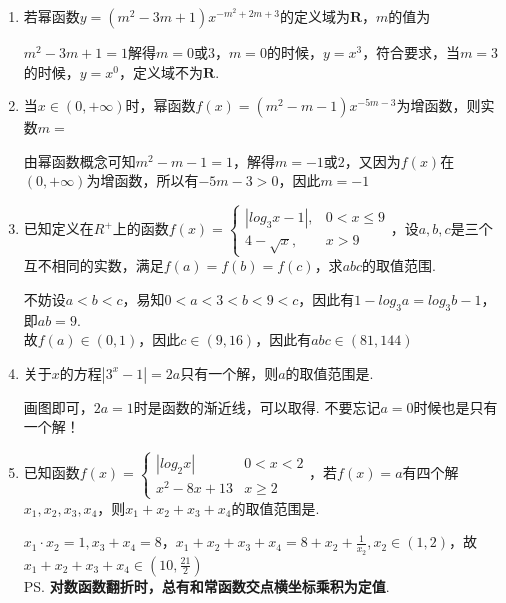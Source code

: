 \begin{enumerate}
    \begin{jieda}
        考虑换底，$log_{xy}z = \frac{log_xz}{log_xy+1}, log_{yz}x = \frac{1}{log_xy+log_xz}, log_{zx}y = \frac{log_xy}{log_xz + 1}$\\
        故设$a = log_xy, b = log_xz$\\
        原式等于$\frac{1 - 2 \cdot \frac{b}{a+1} \cdot \frac{a}{b+1} \cdot \frac{1}{a+b}}{\frac{b}{a+1}\cdot \frac{a}{b+1} + \frac{a}{b+1} \cdot \frac{1}{a+b} + \frac{1}{a+b} \cdot \frac{b}{a+1}} = \frac{(a+1)(b+1)(a+b) - 2ab}{ab(a+b) + a(a+1) + b(b+1)} = 1$
    \end{jieda}
    \item 若幂函数$y = (m^2-3m+1)x^{-m^2+2m+3}$的定义域为$\mathbf{R}$，$m$的值为
    \begin{jieda}
        $m^2-3m+1 = 1$解得$m = 0$或$3$，$m = 0$的时候，$y = x^3$，符合要求，当$m = 3$的时候，$y = x^0$，定义域不为$\mathbf{R}$.
    \end{jieda}
    \item 当$x \in (0, +\infty)$时，幂函数$f(x) = (m^2-m-1)x^{-5m-3}$为增函数，则实数$m =$
    \begin{jieda}
        由幂函数概念可知$m^2-m-1 = 1$，解得$m = -1 \mbox{或} 2$，又因为$f(x)$在$(0, +\infty)$为增函数，所以有$-5m-3 > 0$，因此$m = -1$
    \end{jieda}
    \item 已知定义在$R^{+}$上的函数$f(x) = \left \{\begin{array}{ll}
        |log_3x - 1|, & 0 < x \leq 9 \\
        4-\sqrt{x}, & x > 9
        \end{array} \right.$，设$a, b, c$是三个互不相同的实数，满足$f(a) = f(b) = f(c)$，求$abc$的取值范围.
        \begin{jieda}
            不妨设$a < b < c$，易知$0 < a < 3 < b < 9< c$，因此有$1 - log_3a = log_3b - 1$，即$ab = 9$. \\
            故$f(a) \in (0, 1)$，因此$c \in (9, 16)$，因此有$abc \in (81, 144)$
        \end{jieda}
        \item 关于$x$的方程$|3^x-1| = 2a$只有一个解，则$a$的取值范围是\blkda[3]{$[\frac{1}{2}, +\infty) \cup \{0\}$}.
        \begin{jieda}
            画图即可，$2a = 1$时是函数的渐近线，可以取得. 不要忘记$a = 0$时候也是只有一个解！
        \end{jieda}
    \item 已知函数$f(x) = \left \{ \begin{array}{ll}
        |log_2x| & 0 < x < 2 \\
        x^2 - 8x + 13 & x \geq 2
    \end{array} \right.$，若$f(x) = a$有四个解$x_1, x_2, x_3, x_4$，则$x_1 + x_2 + x_3 + x_4$的取值范围是.
    \begin{jieda}
        $x_1 \cdot x_2 = 1, x_3 + x_4 = 8$，$x_1 + x_2 + x_3 + x_4 = 8 + x_2 + \frac{1}{x_2}, x_2 \in (1, 2)$，故$x_1 + x_2 + x_3 + x_4 \in (10, \frac{21}{2})$ \\
        \ps \textbf{对数函数翻折时，总有和常函数交点横坐标乘积为定值}.
    \end{jieda}
\end{enumerate}
